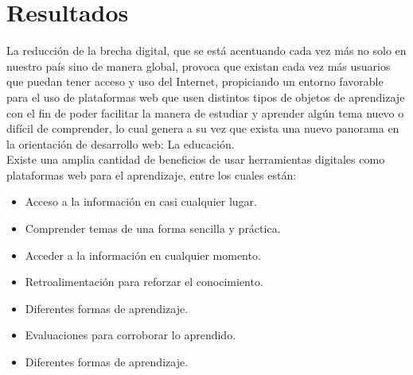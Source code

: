 \documentclass{llncs}
\begin{document}
\section{Resultados}
La reducción de la brecha digital, que se está acentuando cada vez más no solo en nuestro país sino de manera global, provoca que existan cada vez más usuarios que puedan tener acceso y uso del Internet, propiciando un entorno favorable para el uso de plataformas web que usen distintos tipos de objetos de aprendizaje con el fin de poder facilitar la manera de estudiar y aprender algún tema nuevo o difícil de comprender, lo cual genera a su vez que exista una nuevo panorama en la orientación de desarrollo web: La educación.\\
Existe una amplia cantidad de beneficios de usar herramientas digitales como plataformas web para el aprendizaje, entre los cuales están:
\begin{itemize}
\item Acceso a la información en casi cualquier lugar.
\end{itemize}
\begin{itemize}
\item Comprender temas de una forma sencilla y práctica.
\end{itemize}
\begin{itemize}
\item Acceder a la información en cualquier momento.
\end{itemize}
\begin{itemize}
\item  Retroalimentación para reforzar el conocimiento.
\end{itemize}
\begin{itemize}
\item  Diferentes formas de aprendizaje.
\end{itemize}
\begin{itemize}
\item Evaluaciones para corroborar lo aprendido.
\end{itemize}
\begin{itemize}
\item Diferentes formas de aprendizaje.
\end{itemize}

%

%
\end{document}
